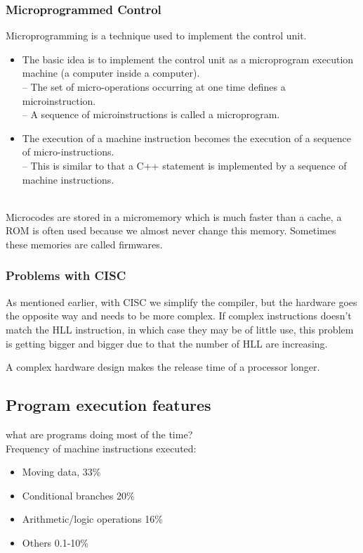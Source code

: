 \subsubsection{Microprogrammed Control}
Microprogramming is a technique used to implement the control unit.
\begin{itemize}
\item The basic idea is to implement the control unit as a microprogram execution machine (a computer inside a computer). \\
  -- The set of micro-operations occurring at one time defines a microinstruction. \\
  -- A sequence of microinstructions is called a microprogram. \\
\item The execution of a machine instruction becomes the execution of a sequence of micro-instructions. \\
  -- This is similar to that a C++ statement is implemented by a sequence of machine instructions.
\end{itemize}

 \\
Microcodes are stored in a micromemory which is much faster than a cache, a ROM is often used because we almost never change this memory. Sometimes these memories are called firmwares.

\subsubsection{Problems with CISC}
As mentioned earlier, with CISC we simplify the compiler, but the hardware goes the opposite way and needs to be more complex. If complex instructions doesn't match the HLL instruction, in which case they may be of little use, this problem is getting bigger and bigger due to that the number of HLL are increasing.

A complex hardware design makes the release time of a processor longer.

\subsection{Program execution features}
what are programs doing most of the time? \\
Frequency of machine instructions executed:
\begin{itemize}
\item Moving data, 33\%
\item Conditional branches  20\%
\item Arithmetic/logic operations  16\%
\item Others  0.1-10\%
\end{itemize}

